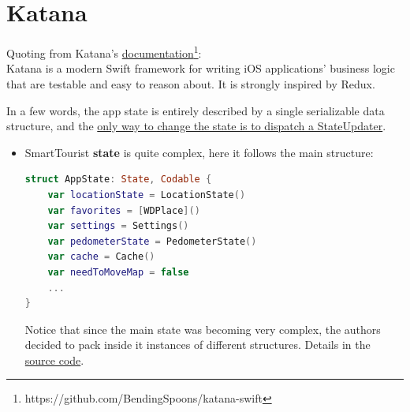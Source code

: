 \documentclass[a4paper, 11pt, parskip=half]{scrreprt}
\theoremstyle{definition}
\newenvironment{info}[1][Info:]{ %
	\medskip
	\begin{mdframed}[style=info]
		\noindent{\textbf{#1}}
}{
	\end{mdframed}
}
\begin{document}
\section{Katana}
Quoting from Katana's \href{https://github.com/BendingSpoons/katana-swift}{documentation}\footnote{https://github.com/BendingSpoons/katana-swift}:
\\Katana is a modern Swift framework for writing iOS applications' business logic that are testable and easy to reason about. It is strongly inspired by Redux.

In a few words, the app state is entirely described by a single serializable data structure, and the \underline{only way to change the state is to dispatch a StateUpdater}. 
\begin{itemize}
	\item SmartTourist \textbf{state} is quite complex, here it follows the main structure:
		
		\begin{lstlisting}[language=swift]
struct AppState: State, Codable {
	var locationState = LocationState()
	var favorites = [WDPlace]()
	var settings = Settings()
	var pedometerState = PedometerState()
	var cache = Cache()
	var needToMoveMap = false
	...
}
		\end{lstlisting}
		
		\begin{info}
			Notice that since the main state was becoming very complex, the authors decided to pack inside it instances of different structures. Details in the \href{https://github.com/Alenichel/CodiglioniNichelini-DIMAProject/blob/master/SmartTourist/State/AppState.swift}{source code}.
		\end{info}
		

\end{itemize}
\end{document}
